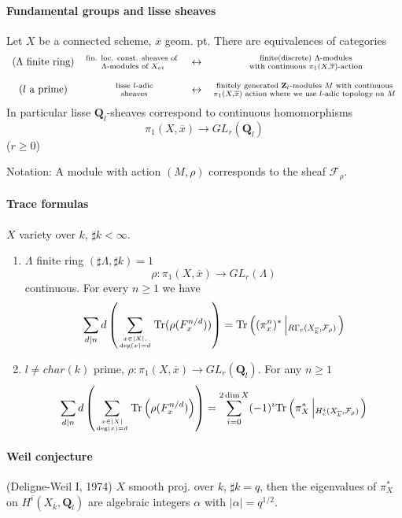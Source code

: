 \paragraph{Fundamental groups and lisse sheaves}
	Let $X$ be a connected scheme, $\overline x$ geom. pt. There are 
equivalences of categories 
		$$\begin{array}{ccccccc}
		\text{($\Lambda$ finite ring)}& \text{fin. loc. const. sheaves 
of }
		\atop \Lambda\text{-modules of }X_{et} & \leftrightarrow & 
\text{ finite(discrete) }\Lambda\text{-modules}\atop\text{ with continuous 
}\pi_1(X, \overline x)\text{-action}\\
		\\
		(l\text{ a prime}) & \text{ lisse }l\text{-adic}\atop\text{ 
sheaves} & \leftrightarrow & \text{ finitely generated 
}\mathbf{Z}_l\text{-modules } M \text{ with continuous }\atop \pi_1(X, 
\overline x)\text{ action where we use $l$-adic topology on } M
		\end{array}$$
In particular lisse $\mathbf{Q}_l$-sheaves correspond to continuous 
homomorphisms 
	$$\pi_1(X, \overline x) \to GL_r(\mathbf{Q}_l)$$
	($r\geq 0$)
	
Notation: A module with action $(M, \rho)$ corresponds to the sheaf 
$\mathcal{F}_\rho$. 

\paragraph{Trace formulas} $X$ variety over $k$, $\sharp k<\infty$. 
\begin{enumerate}
	\item $\Lambda$ finite ring $(\sharp \Lambda, \sharp k)=1$
		$$\rho: \pi_1(X, \overline x)\to GL_r(\Lambda)$$
		continuous. For every $n\geq 1$ we have
		$$\sum_{d|n}d\left(\sum_{x\in |X|, 
\atop\deg(x)=d}\text{Tr}(\rho(F_x^{n/d}))\right) = 
\text{Tr}\left((\pi_x^n)^*\left|_{R\Gamma_c(X_{\overline k}, 
\mathcal{F}_\rho)}\right.\right)$$
		
	\item $l\neq char(k)$ prime, $\rho: \pi_1(X, \overline x)\to 
GL_r(\mathbf{Q}_l)$. For any $n\geq 1$
		$$\sum_{d|n}d\left(\sum_{x\in |X|\atop 
\deg(x)=d}\text{Tr}\left(\rho(F_x^{n/d})\right)\right)=\sum_{i=0}^{2\dim 
X}(-1)^i \text{Tr}\left(\pi_X^*\left|_{H_c^i(X_{\overline k}, 
\mathcal{F}_\rho)}\right.\right)$$
\end{enumerate}

\paragraph{Weil conjecture}  (Deligne-Weil I, 1974) $X$ smooth proj. over $k$, 
$\sharp k=q$, then the eigenvalues of $\pi_X^*$ on $H^i(X_{\overline k}, 
\mathbf{Q}_l)$ are algebraic integers $\alpha$ with $|\alpha|=q^{1/2}$. 

